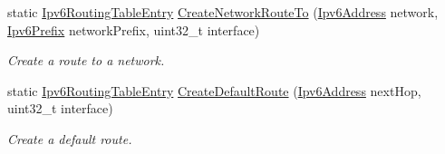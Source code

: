 \begin{DoxyCompactItemize}
static \hyperlink{classns3_1_1Ipv6RoutingTableEntry}{Ipv6\+Routing\+Table\+Entry} \hyperlink{classns3_1_1Ipv6RoutingTableEntry_ad42f5bfc502819a641459190602b2bd0}{Create\+Network\+Route\+To} (\hyperlink{classns3_1_1Ipv6Address}{Ipv6\+Address} network, \hyperlink{classns3_1_1Ipv6Prefix}{Ipv6\+Prefix} network\+Prefix, uint32\+\_\+t interface)
\begin{DoxyCompactList}\small\item\em Create a route to a network. \end{DoxyCompactList}\item 
static \hyperlink{classns3_1_1Ipv6RoutingTableEntry}{Ipv6\+Routing\+Table\+Entry} \hyperlink{classns3_1_1Ipv6RoutingTableEntry_a0f6db3c03c0e141ff0a81372ba35df44}{Create\+Default\+Route} (\hyperlink{classns3_1_1Ipv6Address}{Ipv6\+Address} next\+Hop, uint32\+\_\+t interface)
\begin{DoxyCompactList}\small\item\em Create a default route. \end{DoxyCompactList}\end{DoxyCompactItemize}
